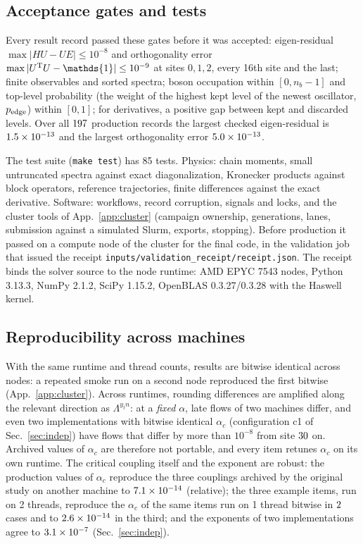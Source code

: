 \documentclass[10pt,a4paper]{article}
\newcommand{\code}[1]{\texttt{#1}}
\newcommand{\one}{\mathds{1}}
\begin{document}
\subsection{Acceptance gates and tests}
Every result record passed these gates before it was accepted: eigen-residual $\max|HU-UE|\le10^{-8}$ and orthogonality error
$\max|U^{\rm T}U-\one|\le10^{-9}$ at sites $0,1,2$, every 16th site and the last; finite observables and sorted spectra; boson
occupation within $[0,n_b-1]$ and top-level probability (the weight of the highest kept level of the newest oscillator,
$p_{\rm edge}$) within $[0,1]$; for derivatives, a positive gap between kept and discarded levels. Over all $197$ production
records the largest checked eigen-residual is $1.5\times10^{-13}$ and the largest orthogonality error $5.0\times10^{-13}$.

The test suite (\code{make test}) has 85 tests. Physics: chain moments, small untruncated spectra against exact diagonalization,
Kronecker products against block operators, reference trajectories, finite differences against the exact derivative. Software:
workflows, record corruption, signals and locks, and the cluster tools of App.~\ref{app:cluster} (campaign ownership, generations,
lanes, submission against a simulated Slurm, exports, stopping). Before production it passed on a compute node of the cluster for the
final code, in the validation job that issued the receipt \code{inputs/validation\_receipt/receipt.json}. The receipt binds the
solver source to the node runtime: AMD EPYC 7543 nodes, Python 3.13.3, NumPy 2.1.2, SciPy 1.15.2, OpenBLAS 0.3.27/0.3.28 with the
Haswell kernel.

\subsection{Reproducibility across machines}
With the same runtime and thread counts, results are bitwise identical across nodes: a repeated smoke run on a second node reproduced
the first bitwise (App.~\ref{app:cluster}). Across runtimes, rounding differences are amplified along the relevant direction as
$\Lambda^{y_tn}$: at a \emph{fixed} $\alpha$, late flows of two machines differ, and even two implementations with bitwise identical
$\alpha_c$ (configuration c1 of Sec.~\ref{sec:indep}) have flows that differ by more than $10^{-8}$ from site $30$ on.
Archived values of $\alpha_c$ are therefore not portable, and every item retunes $\alpha_c$ on its own runtime. The critical coupling
itself and the exponent are robust: the production values of $\alpha_c$ reproduce the three couplings archived by the original study
on another machine to $7.1\times10^{-14}$ (relative); the three example items, run on 2 threads, reproduce the $\alpha_c$ of the same items
run on 1 thread bitwise in $2$ cases and to $2.6\times10^{-14}$ in the third; and the exponents of two implementations agree to
$3.1\times10^{-7}$ (Sec.~\ref{sec:indep}).
\end{document}

